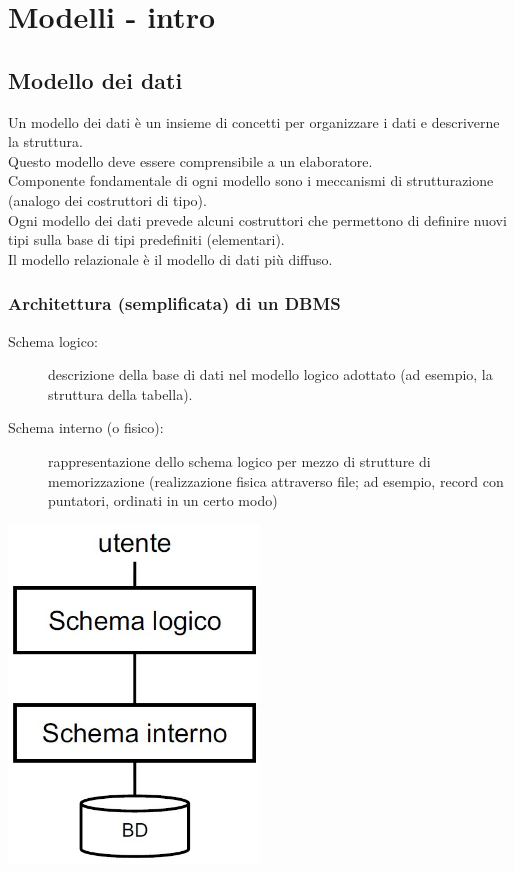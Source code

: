 \chapter{Modelli - intro}
\section{Modello dei dati}
Un modello dei dati è un insieme di concetti per organizzare i dati e descriverne la struttura.
\\Questo modello deve essere comprensibile a un elaboratore.
\\Componente fondamentale di ogni modello sono i meccanismi di strutturazione (analogo dei costruttori di tipo).
\\Ogni modello dei dati prevede alcuni costruttori che permettono di definire nuovi tipi sulla base di tipi predefiniti (elementari).
\\Il modello relazionale è il modello di dati più diffuso.

\subsection{Architettura (semplificata) di un DBMS}
\begin{description}
    \item[Schema logico:] descrizione della base di dati nel modello logico adottato (ad esempio, la struttura della tabella).
    \item[Schema interno (o fisico):] rappresentazione dello schema logico per mezzo di strutture di memorizzazione (realizzazione fisica attraverso file; ad esempio, record con puntatori, ordinati in un certo modo)
\end{description}
\begin{center}
    \includegraphics[width=0.5\textwidth]{img/MR_intro2.jpg}
\end{center}

